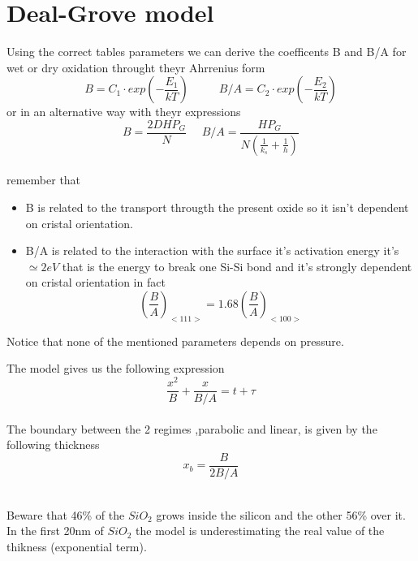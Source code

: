 \section{Deal-Grove model}
Using the correct tables parameters we can derive the coefficents B and B/A for wet or dry oxidation throught theyr Ahrrenius form 
\begin{equation}
B=C_1\cdot exp\left(-\frac{E_1}{kT} \right) \ \ \ \ \ \ \ \ \ \ \ \ B/A=C_2\cdot exp\left(-\frac{E_2}{kT} \right)
\end{equation}
or in an alternative way with theyr expressions
\begin{equation}
B=\frac{2DHP_G}{N} \ \ \ \ \ \ B/A=\frac{HP_G}{N \left( \frac{1}{k_s}+\frac{1}{h}  \right) }
\end{equation}
\\
remember that 
\begin{itemize}
\item B is related to the transport througth the present oxide so it isn't dependent on cristal orientation.
\item B/A is related to the interaction with the surface it's activation energy it's $\simeq 2eV$ that is the energy to break one Si-Si bond and it's strongly dependent on cristal orientation in fact
\begin{equation}
\left(\frac{B}{A}\right)_{<111>}=1.68\left(\frac{B}{A}\right)_{<100>}
\end{equation}
\end{itemize}
Notice that none of the mentioned parameters depends on pressure.\\

\vspace{5mm}

The model gives us the following expression
\begin{equation}
\frac{x^2}{B}+\frac{x}{B/A}=t+\tau
\end{equation}
\\
The boundary between the 2 regimes ,parabolic and linear, is given by the following thickness
\begin{equation}
x_b=\frac{B}{2B/A}
\end{equation}
\\
\vspace{5mm}

Beware that 46\% of the $SiO_2$ grows inside the silicon and the other 56\% over it.\\
\vspace{5mm}
In the first 20nm of $SiO_2$ the model is underestimating the real value of the thikness (exponential term).\\

